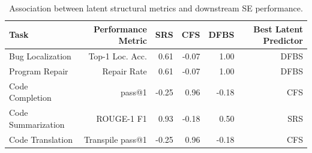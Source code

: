 \begin{table}[t]
\centering
\caption{Association between latent structural metrics and downstream SE performance.}
\label{tab:assoc}
\begin{tabular}{lrrrrr}
\toprule
Task & Performance Metric & SRS & CFS & DFBS & Best Latent Predictor \\
\midrule
Bug Localization & Top-1 Loc. Acc. & 0.61 & -0.07 & 1.00 & DFBS \\
Program Repair & Repair Rate & 0.61 & -0.07 & 1.00 & DFBS \\
Code Completion & pass@1 & -0.25 & 0.96 & -0.18 & CFS \\
Code Summarization & ROUGE-1 F1 & 0.93 & -0.18 & 0.50 & SRS \\
Code Translation & Transpile pass@1 & -0.25 & 0.96 & -0.18 & CFS \\
\bottomrule
\end{tabular}
\end{table}
